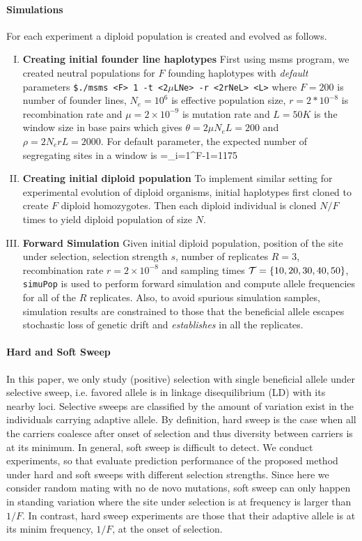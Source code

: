 \documentclass[11pt]{article}
\begin{document}
\paragraph{Simulations}
For each experiment a diploid population is created and evolved as follows. 
\begin{enumerate}[I.]
	\item {\bf Creating initial founder line haplotypes}
	First using msms program, we created neutral populations for $F$ founding 
	haplotypes with \emph{default} parameters \texttt{\$./msms <F> 1 -t 
	<2$\mu$LNe> 
		-r <2rNeL> 
		<L>} 
	where $F=200$ is number of founder lines, $N_e=10^6$ is 
	effective 
	population size, $r=2*10^{-8}$ is recombination rate and $\mu=2\times 
	10^{-9}$ is mutation rate and  $L=50K$ is the window size in base pairs 
	which gives $\theta=2\mu N_eL=200$ and $\rho=2N_erL=2000$. For default 
	parameter, the expected number of segregating sites in a window is 
	\beqq
	\Ebb[M]=\theta \sum_{i=1}^{F-1}=1175
	\eeqq
	\item{\bf Creating initial diploid population} 
	To implement similar setting for experimental evolution of diploid 
	organisms, 
	initial  haplotypes first cloned to create $F$ diploid homozygotes. Then 
	each 
	diploid individual is  cloned $N/F$ times to yield diploid population of 
	size 
	$N$.
	\item{\bf Forward Simulation}
	Given initial diploid population, position of the site under selection, 
	selection 
	strength $s$, number of replicates $R=3$, recombination rate 
	$r=2\times10^{-8}$ 
	and sampling times ${\cal T}=\{10,20,30,40,50\}$, \texttt{simuPop} is used to 
	perform
	forward simulation and  compute allele frequencies for all of the $R$ 
	replicates. Also, to avoid spurious simulation samples, simulation results 
	are constrained to those that the beneficial allele escapes stochastic loss 
	of genetic drift and \emph{establishes} in all the replicates. 
\end{enumerate}

\paragraph{Hard and Soft Sweep}
In this paper, we only study (positive) selection with single beneficial allele 
under selective sweep, i.e. favored allele is in linkage disequilibrium (LD) 
with its nearby loci. Selective sweeps are classified by the amount of 
variation exist in the individuals carrying adaptive allele. By definition, 
hard sweep is the case when all the carriers coalesce after onset of selection 
and thus diversity between carriers is at its minimum. 
In general, soft sweep is difficult to detect. We conduct experiments, so that 
evaluate prediction performance of the proposed method under hard and soft 
sweeps with different selection strengths. Since here we consider random mating 
with no de novo mutations, soft sweep can only happen in standing variation 
where the site under selection is at frequency is larger than $1/F$. In 
contrast, hard sweep experiments are those that their adaptive allele is at its 
minim frequency, $1/F$, at the onset of selection.
\end{document}
